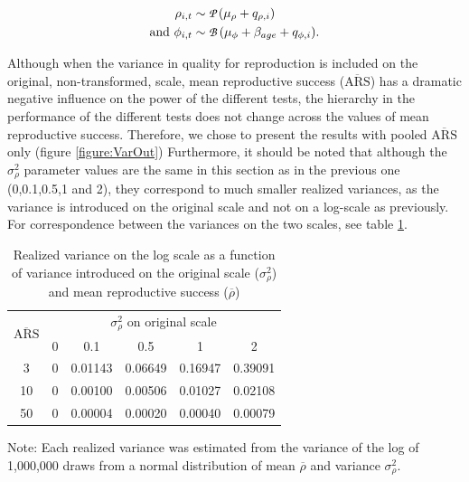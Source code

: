 \begin{subequations}\label{eq:varout}
\begin{align}
\rho_{i,t} &\sim \text{{\fontfamily{pzc}\selectfont P }}(\mu_{\rho}+q_{\rho,i})\\
\text{and } \phi_{i,t} &\sim \text{{\fontfamily{pzc}\selectfont B }}(\mu_{\phi}+\beta_{age}+q_{\phi,i}).
\end{align}
\end{subequations}


Although when the variance in quality for reproduction is included on the original, non-transformed, scale, mean reproductive success ($\overline{\mathrm{ARS}}$) has a dramatic negative influence on the power of the different tests, the hierarchy in the performance of the different tests does not change across the values of mean reproductive success. Therefore, we chose to present the results with pooled $\overline{\mathrm{ARS}}$ only (figure \ref{figure:VarOut})
Furthermore, it should be noted that although the $\sigma_{\rho}^2$ parameter values are the same in this section as in the previous one (0,0.1,0.5,1 and 2), they correspond to much smaller realized variances, as the variance is introduced on the original scale and not on a log-scale as previously. For correspondence between the variances on the two scales, see table \ref{table:Vlink}. 

\begin{table}[h]
\caption{Realized variance on the log scale as a function of variance introduced on the original scale ($\sigma_{\rho}^2$) and  mean reproductive success ($\overline{\rho}$)}
\begin{center}
\footnotesize
\begin{tabular}{c c c c c c}
\toprule
\multirow{2}{*}{$\overline{\mathrm{ARS}}$} &\multicolumn{5}{c}{$\sigma_{\rho}^2$ on original scale}\\
\cmidrule(r){2-6}
 & 0 & 0.1 & 0.5 & 1 & 2\\
\midrule
3 & 0 & 0.01143 & 0.06649 & 0.16947 & 0.39091 \\
10 & 0 & 0.00100 & 0.00506 & 0.01027 & 0.02108 \\
50 & 0 & 0.00004 & 0.00020 & 0.00040 & 0.00079 \\
\bottomrule
\end{tabular}
\end{center}
\label{table:Vlink}

{\scriptsize Note: Each realized variance was estimated from the variance of the log of 1,000,000 draws from a normal distribution of mean $\overline{\rho}$ and variance $\sigma_{\rho}^2$.}
\end{table}

